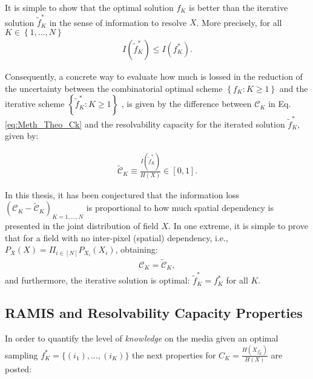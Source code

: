 It is simple to show that the optimal solution $f_{K}$ is better than the iterative solution $\tilde{f}^{*}_{K}$ in the sense of information to resolve $X$. More precisely,  for all  $K \in   \left\{1,\ldots,N \right\}$
\begin{align}\label{eq:Meth_Iter_OWP_Prop_If}
	I(\tilde{f}^{*}_{K}) \leq I({f}^{*}_{K}). 
\end{align}

Consequently, a concrete way to evaluate how much is lossed in the reduction of the uncertainty between 
the combinatorial optimal scheme $\left\{{f}_{K}: K\geq 1 \right\}$ and the iterative scheme $\left\{\tilde{f}^{*}_{K}: K \geq 1 \right\}$ , %
 is given by the difference between $\mathcal{C}_{K}$ in Eq. \eqref{eq:Meth_Theo_Ck} and the resolvability capacity for the iterated solution $\tilde{f}^{*}_{K}$, given by: 

\begin{align}\label{eq:Meth_Iter_OWP_Ck}
	\mathcal{\tilde{C}}_{K} \equiv \frac{I(\tilde{f}^{*}_{K})}{H(X)} \in [0,1]. 
\end{align}

In this thesis, it has been conjectured that the information loss $(\mathcal{C}_{K}- \mathcal{\tilde{C}}_{K})_{K=1,\ldots,N} $ is proportional to how much spatial dependency is presented in the joint distribution of field $X$. In one extreme, it is simple to prove that for a field with no inter-pixel (spatial) dependency, i.e., $P_{X}(X)=\Pi_{i \in [N]} P_{X_{ i }}(X_{ i })$, obtaining: 
\begin{align}\label{eq:Meth_Iter_OWP_Prop_Ck_Independent}
	\mathcal{C}_{K}= \mathcal{\tilde{C}}_{K}, 
\end{align}
and furthermore, the iterative solution is optimal: $\tilde{f}^{*}_{K}= {f}^{*}_{K}$ for all $K$. %


\subsection{RAMIS and Resolvability Capacity Properties}

In order to quantify the level of \emph{knowledge} on the media given an optimal sampling $f^{*}_{K} = \lbrace (i_1),\ldots,(i_K)\rbrace $ the next properties for $C_{K} = \displaystyle \frac{H(X_{f^{*}_{K}})}{H(X)}$ are posted:
	
